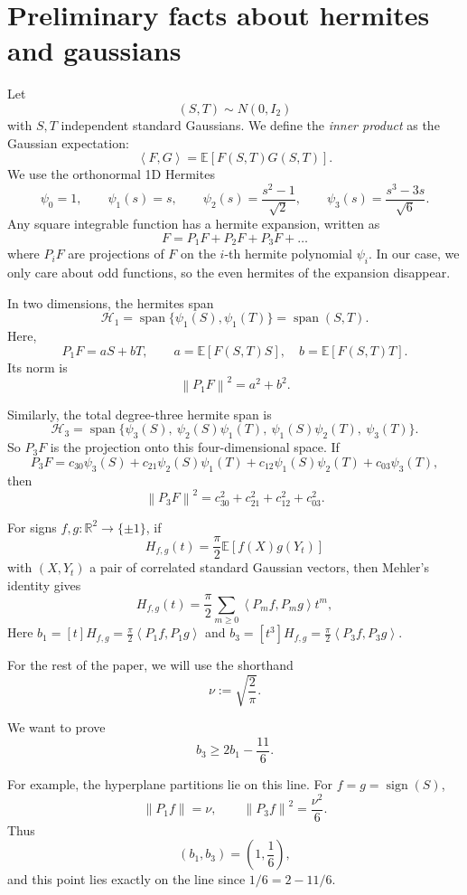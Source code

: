 \documentclass[11pt]{article}
\newcommand{\R}{\mathbb R}
\newcommand{\E}{\mathbb E}
\newcommand{\ip}[2]{\left\langle #1,#2\right\rangle}
\newcommand{\norm}[1]{\left\|#1\right\|}
\newcommand{\cH}{\mathcal H}
\newcommand{\sgn}{\operatorname{sign}}
\begin{document}
\section{Preliminary facts about hermites and gaussians}

Let
\[
        (S,T)\sim N(0,I_2)
\]
with $S,T$ independent standard Gaussians. We define the \textit{inner product} as the Gaussian expectation:
\[
        \ip{F}{G}=\E[F(S,T)G(S,T)].
\]
We use the orthonormal 1D Hermites
\[
        \psi_0=1,\qquad
        \psi_1(s)=s,\qquad
        \psi_2(s)=\frac{s^2-1}{\sqrt2},\qquad
        \psi_3(s)=\frac{s^3-3s}{\sqrt6}.
\]
Any square integrable function has a hermite expansion, written as 
\[F = P_1  F + P_2 F + P_3 F + \ldots \]
where $P_i F$ are projections of $F$ on the $i$-th hermite polynomial $\psi_i$. In our case, we only care about odd functions, so the even hermites of the expansion disappear. 

In two dimensions, the hermites span
\[
        \cH_1=\operatorname{span}\{\psi_1(S),\psi_1(T)\} = \operatorname{span}(S, T).
\]
Here, 
\[
        P_1F=aS+bT,
        \qquad
        a=\E[F(S,T)S],\quad b=\E[F(S,T)T].
\]
Its norm is
\[
        \norm{P_1F}^2=a^2+b^2.
\]

Similarly, the total degree-three hermite span is
\[
        \cH_3=\operatorname{span}\{\psi_3(S),\ \psi_2(S)\psi_1(T),\ \psi_1(S)\psi_2(T),\ \psi_3(T)\}.
\]
So $P_3F$ is the projection onto this four-dimensional space.  If
\[
        P_3F
        =c_{30}\psi_3(S)
         +c_{21}\psi_2(S)\psi_1(T)
         +c_{12}\psi_1(S)\psi_2(T)
         +c_{03}\psi_3(T),
\]
then
\[
        \norm{P_3F}^2=c_{30}^2+c_{21}^2+c_{12}^2+c_{03}^2.
\]


For signs $f,g:\R^2\to\{\pm1\}$, if
\[
        H_{f,g}(t)=\frac\pi2\E[f(X)g(Y_t)]
\]
with $(X,Y_t)$ a pair of correlated standard Gaussian vectors, then Mehler's identity gives
\[
        H_{f,g}(t)=\frac\pi2\sum_{m\ge0}\ip{P_mf}{P_mg}t^m,
\]
Here $b_1=[t]H_{f,g} = \frac\pi2\ip{P_1f}{P_1g}$ and $b_3=[t^3]H_{f,g} = \frac\pi2\ip{P_3f}{P_3g}$.

For the rest of the paper, we will use the shorthand
\[
\nu := \sqrt{\frac{2}{\pi}}.
\]

We want to prove 
\begin{equation}
        b_3 \ge 2b_1 -\frac{11}{6}.
        \tag{Strip}
\end{equation}

For example, the hyperplane partitions lie on this line.  For $f=g=\sgn(S)$,
\[
        \norm{P_1f}=\nu,
        \qquad
        \norm{P_3f}^2=\frac{\nu^2}{6}.
\]
Thus
\[
        (b_1,b_3)=\left(1,\frac16\right),
\]
and this point lies exactly on the line since $1/6=2-11/6$.
\end{document}
